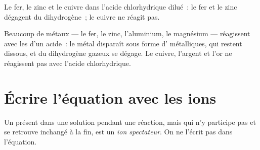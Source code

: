 \begin{omfigure}

{\small Le fer, le zinc et le cuivre dans l'acide chlorhydrique dilué~:
le fer et le zinc dégagent du dihydrogène~; le cuivre ne réagit pas.}
\end{omfigure}

\begin{proposition}\label{prop:g9:metals-acids-corrosion:acid}
Beaucoup de métaux --- le fer, le zinc, l'aluminium, le magnésium ---
réagissent avec les   d'un acide~: le métal disparaît sous
forme d' métalliques, qui restent dissous, et du dihydrogène gazeux
se dégage. Le cuivre, l'argent et l'or ne réagissent pas avec l'acide
chlorhydrique.
\end{proposition}

\section{Écrire l'équation avec les ions}

\begin{definition}\label{def:g9:metals-acids-corrosion:spectator}
Un  présent dans une solution pendant une réaction, mais qui n'y
participe pas et se retrouve inchangé à la fin, est un \emph{ion
spectateur}. On ne l'écrit pas dans l'équation.
\end{definition}

